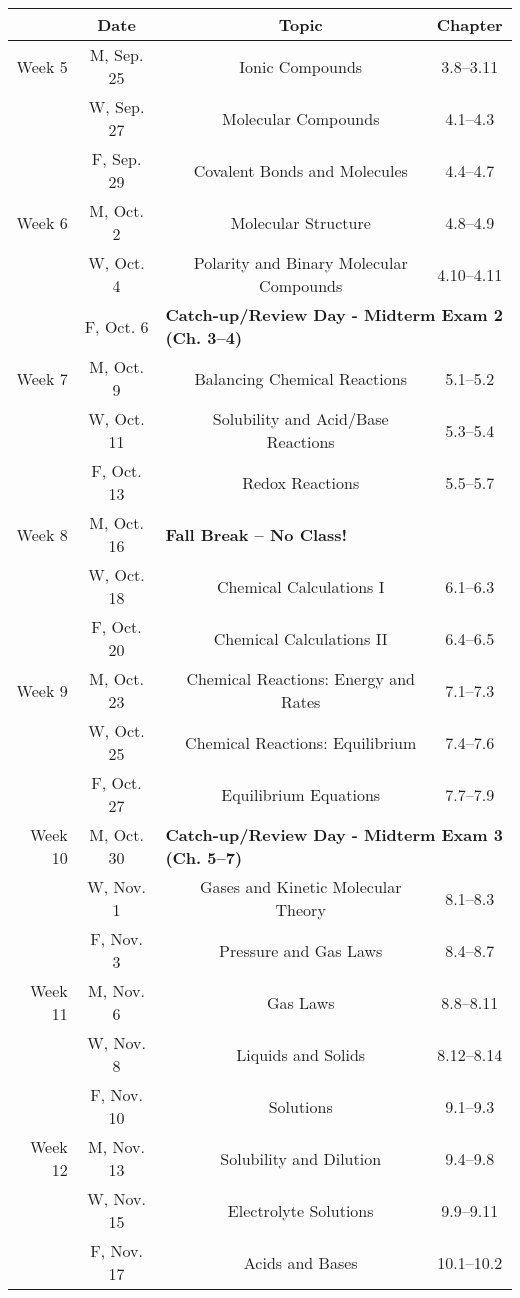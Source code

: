 \documentclass[12pt, letterpaper]{article}
\begin{document}
\noindent
\begin{tabular}{rcccc}
& Date && Topic & Chapter\\
\midrule
Week 5 & M, Sep. 25&& Ionic Compounds & 3.8--3.11\\
& W, Sep. 27&& Molecular Compounds & 4.1--4.3\\
& F, Sep. 29&& Covalent Bonds and Molecules & 4.4--4.7\\
\midrule
Week 6 & M, Oct. 2&& Molecular Structure & 4.8--4.9\\
& W, Oct. 4&& Polarity and Binary Molecular Compounds & 4.10--4.11\\
& F, Oct. 6& \multicolumn{3}{l}{\textbf{Catch-up/Review Day - Midterm Exam 2 (Ch. 3--4)}}\\
\midrule
Week 7 & M, Oct. 9&& Balancing Chemical Reactions & 5.1--5.2\\
& W, Oct. 11&& Solubility and Acid/Base Reactions & 5.3--5.4\\
& F, Oct. 13&& Redox Reactions & 5.5--5.7\\
\midrule
Week 8 & M, Oct. 16& \multicolumn{3}{l}{\textbf{Fall Break -- No Class!}}\\
& W, Oct. 18&& Chemical Calculations I & 6.1--6.3\\
& F, Oct. 20&& Chemical Calculations II & 6.4--6.5\\
\midrule
Week 9 & M, Oct. 23&& Chemical Reactions: Energy and Rates & 7.1--7.3\\
& W, Oct. 25&& Chemical Reactions: Equilibrium & 7.4--7.6\\
& F, Oct. 27&& Equilibrium Equations & 7.7--7.9\\
\midrule
Week 10 & M, Oct. 30& \multicolumn{3}{l}{\textbf{Catch-up/Review Day - Midterm Exam 3 (Ch. 5--7)}}\\
& W, Nov. 1&& Gases and Kinetic Molecular Theory & 8.1--8.3\\
& F, Nov. 3&& Pressure and Gas Laws & 8.4--8.7\\
\midrule
Week 11 & M, Nov. 6&& Gas Laws & 8.8--8.11\\
& W, Nov. 8&& Liquids and Solids & 8.12--8.14\\
& F, Nov. 10&& Solutions & 9.1--9.3\\
\midrule
Week 12 & M, Nov. 13&& Solubility and Dilution & 9.4--9.8\\
& W, Nov. 15&& Electrolyte Solutions & 9.9--9.11\\
& F, Nov. 17&& Acids and Bases & 10.1--10.2\\
\end{tabular}
\end{document}
